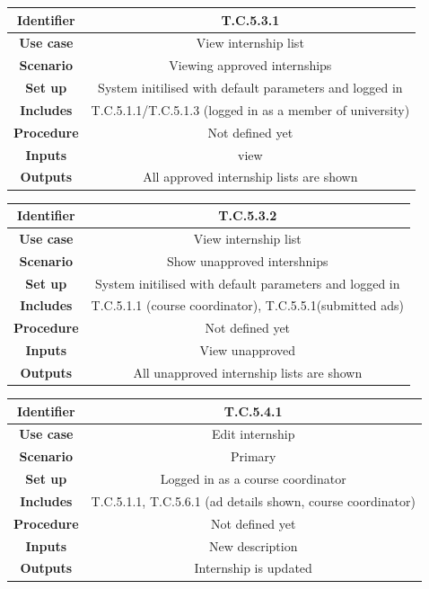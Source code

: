 \documentclass{l3deliverable}
\begin{document}
\begin{tabular}{|c|c|}
\hline \textbf{Identifier} & T.C.5.3.1 \\
\hline \textbf{Use case} & View internship list\\
\hline \textbf{Scenario} & Viewing approved internships\\
\hline \textbf{Set up} & System initilised with default parameters and logged in\\
\hline \textbf{Includes} & T.C.5.1.1/T.C.5.1.3 (logged in as a member of university)\\
\hline \textbf{Procedure} & Not defined yet\\
\hline \textbf{Inputs} & view\\
\hline \textbf{Outputs} & All approved internship lists are shown\\
\hline
\end{tabular}

\begin{tabular}{|c|c|}
\hline \textbf{Identifier} & T.C.5.3.2 \\
\hline \textbf{Use case} & View internship list\\
\hline \textbf{Scenario} & Show unapproved intershnips\\
\hline \textbf{Set up} & System initilised with default parameters and logged in\\
\hline \textbf{Includes} &T.C.5.1.1 (course coordinator), T.C.5.5.1(submitted ads)\\
\hline \textbf{Procedure} & Not defined yet\\
\hline \textbf{Inputs} & View unapproved\\
\hline \textbf{Outputs} & All unapproved internship lists are shown\\
\hline
\end{tabular}

\begin{tabular}{|c|c|}
\hline \textbf{Identifier} & T.C.5.4.1 \\
\hline \textbf{Use case} & Edit internship\\
\hline \textbf{Scenario} & Primary\\
\hline \textbf{Set up} & Logged in as a course coordinator\\
\hline \textbf{Includes} & T.C.5.1.1, T.C.5.6.1 (ad details shown, course coordinator)\\
\hline \textbf{Procedure} & Not defined yet \\
\hline \textbf{Inputs} & New description\\
\hline \textbf{Outputs} & Internship is updated\\
\hline
\end{tabular}
\end{document}
